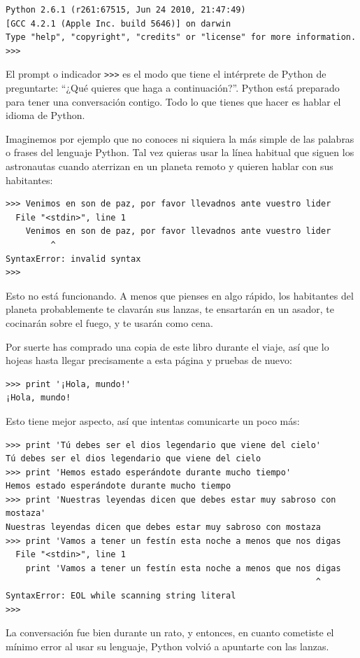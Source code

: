 
\beforeverb
\begin{verbatim}
Python 2.6.1 (r261:67515, Jun 24 2010, 21:47:49) 
[GCC 4.2.1 (Apple Inc. build 5646)] on darwin
Type "help", "copyright", "credits" or "license" for more information.
>>> 
\end{verbatim}
\afterverb
%
El prompt o indicador {\tt \verb">>>"} es el modo que tiene el intérprete de Python de preguntarte:
``¿Qué quieres que haga a continuación?''. Python está preparado para tener una conversación contigo. Todo lo que tienes que hacer es hablar el idioma de Python.

Imaginemos por ejemplo que no conoces ni siquiera la más simple de las palabras o frases del lenguaje Python. Tal vez quieras usar la línea habitual que siguen los astronautas cuando aterrizan en un planeta remoto y quieren hablar con sus habitantes:

\beforeverb
\begin{verbatim}
>>> Venimos en son de paz, por favor llevadnos ante vuestro lider
  File "<stdin>", line 1
    Venimos en son de paz, por favor llevadnos ante vuestro lider
         ^
SyntaxError: invalid syntax
>>> 
\end{verbatim}
\afterverb
%
Esto no está funcionando. A menos que pienses en algo rápido,
los habitantes del planeta probablemente te clavarán sus lanzas,
te ensartarán en un asador, te cocinarán sobre el fuego, y te usarán como cena.

Por suerte has comprado una copia de este libro durante el viaje, así que lo hojeas
hasta llegar precisamente a esta página y pruebas de nuevo:

\beforeverb
\begin{verbatim}
>>> print '¡Hola, mundo!'
¡Hola, mundo!
\end{verbatim}
\afterverb
%
Esto tiene mejor aspecto, así que intentas comunicarte un poco
más:

\beforeverb
\begin{verbatim}
>>> print 'Tú debes ser el dios legendario que viene del cielo'
Tú debes ser el dios legendario que viene del cielo
>>> print 'Hemos estado esperándote durante mucho tiempo'
Hemos estado esperándote durante mucho tiempo
>>> print 'Nuestras leyendas dicen que debes estar muy sabroso con mostaza'
Nuestras leyendas dicen que debes estar muy sabroso con mostaza
>>> print 'Vamos a tener un festín esta noche a menos que nos digas
  File "<stdin>", line 1
    print 'Vamos a tener un festín esta noche a menos que nos digas
                                                              ^
SyntaxError: EOL while scanning string literal
>>> 
\end{verbatim}
\afterverb
%
La conversación fue bien durante un rato, y entonces, en cuanto
cometiste el mínimo error al usar su lenguaje, Python
volvió a apuntarte con las lanzas.


